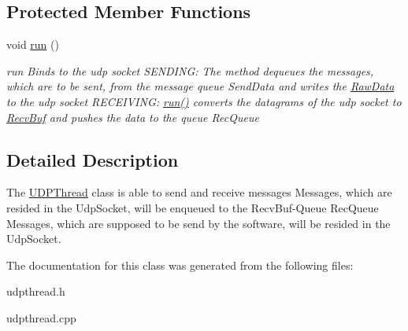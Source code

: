 \subsection*{Protected Member Functions}
\begin{DoxyCompactItemize}
\item 
\hypertarget{class_u_d_p_thread_a1ef491338c2f7b358968505b82a73a87}{}void \hyperlink{class_u_d_p_thread_a1ef491338c2f7b358968505b82a73a87}{run} ()\label{class_u_d_p_thread_a1ef491338c2f7b358968505b82a73a87}

\begin{DoxyCompactList}\small\item\em run Binds to the udp socket S\+E\+N\+D\+I\+N\+G\+: The method dequeues the messages, which are to be sent, from the message queue Send\+Data and writes the \hyperlink{struct_raw_data}{Raw\+Data} to the udp socket R\+E\+C\+E\+I\+V\+I\+N\+G\+: \hyperlink{class_u_d_p_thread_a1ef491338c2f7b358968505b82a73a87}{run()} converts the datagrams of the udp socket to \hyperlink{struct_recv_buf}{Recv\+Buf} and pushes the data to the queue Rec\+Queue \end{DoxyCompactList}\end{DoxyCompactItemize}


\subsection{Detailed Description}
The \hyperlink{class_u_d_p_thread}{U\+D\+P\+Thread} class is able to send and receive messages Messages, which are resided in the Udp\+Socket, will be enqueued to the Recv\+Buf-\/\+Queue Rec\+Queue Messages, which are supposed to be send by the software, will be resided in the Udp\+Socket. 

The documentation for this class was generated from the following files\+:\begin{DoxyCompactItemize}
\item 
udpthread.\+h\item 
udpthread.\+cpp\end{DoxyCompactItemize}
